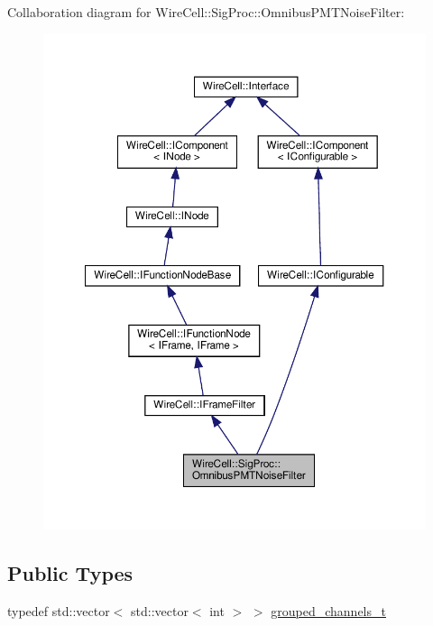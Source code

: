 Collaboration diagram for Wire\+Cell\+:\+:Sig\+Proc\+:\+:Omnibus\+P\+M\+T\+Noise\+Filter\+:
\nopagebreak
\begin{figure}[H]
\begin{center}
\leavevmode
\includegraphics[width=350pt]{class_wire_cell_1_1_sig_proc_1_1_omnibus_p_m_t_noise_filter__coll__graph}
\end{center}
\end{figure}
\subsection*{Public Types}
\begin{DoxyCompactItemize}
\item 
typedef std\+::vector$<$ std\+::vector$<$ int $>$ $>$ \hyperlink{class_wire_cell_1_1_sig_proc_1_1_omnibus_p_m_t_noise_filter_a8d4cbd8915593acb3881bfd0d380be66}{grouped\+\_\+channels\+\_\+t}
\end{DoxyCompactItemize}
